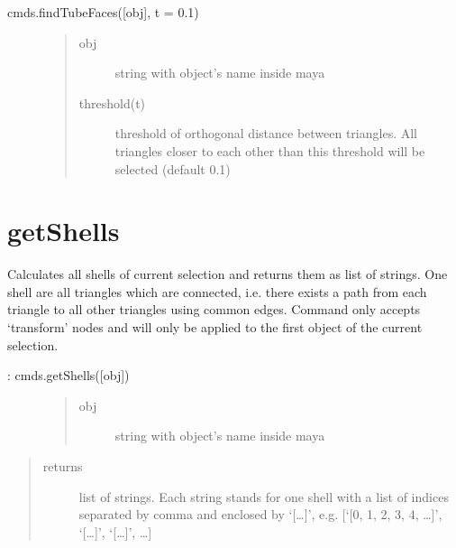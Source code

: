 \documentclass[letterpaper,10pt,english]{sphinxmanual}
\begin{document}
 cmds.findTubeFaces({[}obj{]}, t = 0.1)
\begin{description}
\item[{}] \leavevmode\begin{quote}\begin{description}
\item[{obj}] \leavevmode
string with object’s name inside maya

\item[{threshold(t)}] \leavevmode
threshold of orthogonal distance between triangles. All triangles closer to each other than this threshold will be selected (default 0.1)

\end{description}\end{quote}

\end{description}


\section{getShells}
\label{\detokenize{pk_src.getShells:getshells}}\label{\detokenize{pk_src.getShells::doc}}\label{\detokenize{pk_src.getShells:id1}}
{\hyperref[\detokenize{index:commands}]{}}
\label{\detokenize{pk_src.getShells:module-pk_src.getShells}}
Calculates all shells of current selection and returns them as list of strings. One shell are all triangles which are connected, i.e. there exists a path from each triangle to all other triangles using common edges.
Command only accepts ‘transform’ nodes and will only be applied to the first object of the current selection.

: cmds.getShells({[}obj{]})
\begin{description}
\item[{}] \leavevmode\begin{quote}\begin{description}
\item[{obj}] \leavevmode
string with object’s name inside maya

\end{description}\end{quote}

\end{description}
\begin{quote}\begin{description}
\item[{returns}] \leavevmode
list of strings. Each string stands for one shell with a list of indices separated by comma and enclosed by ‘{[}…{]}’, e.g. {[}‘{[}0, 1, 2, 3, 4, …{]}’, ‘{[}…{]}’, ‘{[}…{]}’, …{]}

\end{description}\end{quote}
\end{document}

